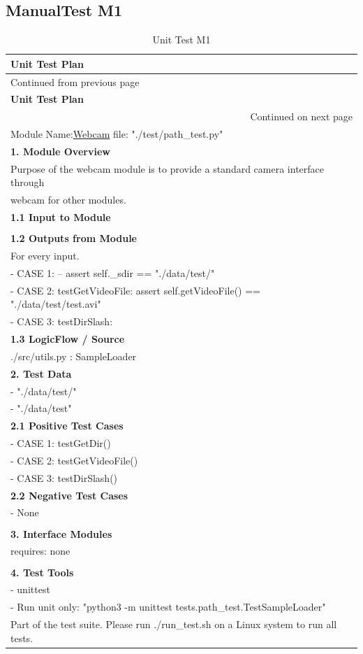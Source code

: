 \documentclass[12pt,a4paper,man]{report}
\begin{document}
\subsection{ManualTest M1}
\label{sec:orgc547e9e}
\begin{longtable}{|p{7in}|}
\caption{\label{table:utest_m1}
Unit Test M1}
\\
\hline
\textbf{Unit Test Plan} \cellcolor{blue!25}\\
\hline
\endfirsthead
\multicolumn{1}{l}{Continued from previous page} \\
\hline

\textbf{Unit Test Plan} \cellcolor{blue!25} \\

\hline
\endhead
\hline\multicolumn{1}{r}{Continued on next page} \\
\endfoot
\endlastfoot
\hline
\hline
Module Name:\underline{Webcam} \hspace{2in}  file:  "./test/path\_test.py"\\
\hline
\textbf{1. Module Overview}\\
\hline
Purpose of the webcam module is to provide a standard camera interface through\\
webcam for other modules.\\
\hline
\textbf{1.1 Input to Module}\\
\hline
\\
\hline
\textbf{1.2 Outputs from Module}\\
\hline
For every input.\\
- CASE 1:  -- assert self.\_sdir == "./data/test/"\\
- CASE 2: testGetVideoFile: assert self.getVideoFile() == "./data/test/test.avi"\\
- CASE 3: testDirSlash:\\
\hline
\textbf{1.3 LogicFlow / Source}\\
\hline
./src/utils.py : SampleLoader\\
\hline
\textbf{2. Test Data}\\
\hline
- "./data/test/"\\
- "./data/test"\\
\hline
\textbf{2.1 Positive Test Cases}\\
\hline
- CASE 1: testGetDir()\\
- CASE 2: testGetVideoFile()\\
- CASE 3: testDirSlash()\\
\hline
\textbf{2.2 Negative Test Cases}\\
\hline
- None\\
\\
\hline
\textbf{3. Interface Modules}\\
\hline
requires: none\\
\\
\hline
\textbf{4. Test Tools}\\
\hline
- unittest\\
- Run unit only: "python3 -m unittest tests.path\_test.TestSampleLoader"\\
Part of the test suite. Please run ./run\_test.sh on a Linux system to run all tests.\\
\hline
\end{longtable}
\end{document}
